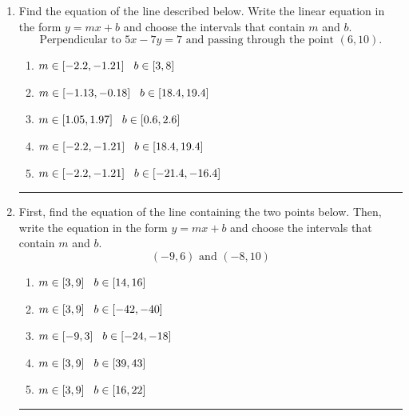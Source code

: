 \documentclass[14pt]{extbook}
\newcommand{\litem}[1]{\item#1\hspace*{-1cm}\rule{\textwidth}{0.4pt}}
\begin{document}
\begin{enumerate}
{\begin{enumerate}[label=\Alph*.]
\end{enumerate} }
\litem{
Find the equation of the line described below. Write the linear equation in the form $ y=mx+b $ and choose the intervals that contain $m$ and $b$.\[ \text{Perpendicular to } 5 x - 7 y = 7 \text{ and passing through the point } (6, 10). \]\begin{enumerate}[label=\Alph*.]
\item \( m \in [-2.2, -1.21] \hspace*{3mm} b \in [3, 8] \)
\item \( m \in [-1.13, -0.18] \hspace*{3mm} b \in [18.4, 19.4] \)
\item \( m \in [1.05, 1.97] \hspace*{3mm} b \in [0.6, 2.6] \)
\item \( m \in [-2.2, -1.21] \hspace*{3mm} b \in [18.4, 19.4] \)
\item \( m \in [-2.2, -1.21] \hspace*{3mm} b \in [-21.4, -16.4] \)

\end{enumerate} }
\litem{
First, find the equation of the line containing the two points below. Then, write the equation in the form $ y=mx+b $ and choose the intervals that contain $m$ and $b$.\[ (-9, 6) \text{ and } (-8, 10) \]\begin{enumerate}[label=\Alph*.]
\item \( m \in [3, 9] \hspace*{3mm} b \in [14, 16] \)
\item \( m \in [3, 9] \hspace*{3mm} b \in [-42, -40] \)
\item \( m \in [-9, 3] \hspace*{3mm} b \in [-24, -18] \)
\item \( m \in [3, 9] \hspace*{3mm} b \in [39, 43] \)
\item \( m \in [3, 9] \hspace*{3mm} b \in [16, 22] \)


\end{enumerate}}
\end{enumerate}
\end{document}
